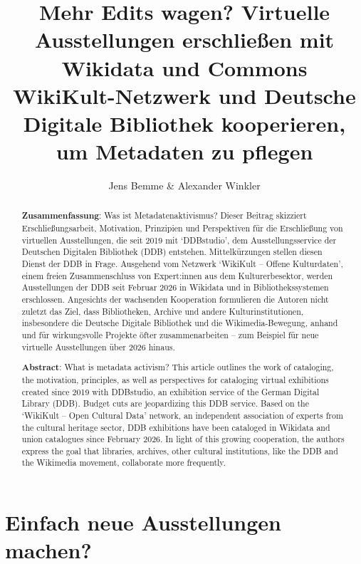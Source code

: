\documentclass[a4paper,
fontsize=11pt,
oneside,
numbers=noperiodatend,
parskip=half-,
bibliography=totoc,
final
]{scrartcl}
\title{\LARGE{Mehr Edits wagen? Virtuelle Ausstellungen erschließen mit Wikidata und Commons \\ WikiKult-Netzwerk und Deutsche Digitale Bibliothek kooperieren, um Metadaten zu pflegen}}%
\author{Jens Bemme \& Alexander Winkler} %
\date{}
\begin{document}
\maketitle
\thispagestyle{fancyplain} 

\begin{abstract}
\noindent
\textbf{Zusammenfassung}: Was ist Metadatenaktivismus? Dieser Beitrag
skizziert Erschließungsarbeit, Motivation, Prinzipien und Perspektiven
für die Erschließung von virtuellen Ausstellungen, die seit 2019 mit
`DDBstudio', dem Ausstellungsservice der Deutschen Digitalen Bibliothek
(DDB) entstehen. Mittelkürzungen stellen diesen Dienst der DDB in Frage.
Ausgehend vom Netzwerk `WikiKult -- Offene Kulturdaten', einem freien
Zusammenschluss von Expert:innen aus dem Kulturerbesektor, werden
Ausstellungen der DDB seit Februar 2026 in Wikidata und in
Bibliothekssystemen erschlossen. Angesichts der wachsenden Kooperation
formulieren die Autoren nicht zuletzt das Ziel, dass Bibliotheken,
Archive und andere Kulturinstitutionen, insbesondere die Deutsche
Digitale Bibliothek und die Wikimedia-Bewegung, anhand und für
wirkungsvolle Projekte öfter zusammenarbeiten -- zum Beispiel für neue
virtuelle Ausstellungen über 2026 hinaus.

\noindent
\textbf{Abstract}: What is metadata activism? This article outlines the
work of cataloging, the motivation, principles, as well as perspectives
for cataloging virtual exhibitions created since 2019 with DDBstudio, an
exhibition service of the German Digital Library (DDB). Budget cuts are
jeopardizing this DDB service. Based on the `WikiKult -- Open Cultural
Data' network, an independent association of experts from the cultural
heritage sector, DDB exhibitions have been cataloged in Wikidata and
union catalogues since February 2026. In light of this growing
cooperation, the authors express the goal that libraries, archives,
other cultural institutions, like the DDB and the Wikimedia movement,
collaborate more frequently.
\end{abstract}

\hypertarget{einfach-neue-ausstellungen-machen}{%
\section{Einfach neue Ausstellungen
machen?}\label{einfach-neue-ausstellungen-machen}}
\end{document}
